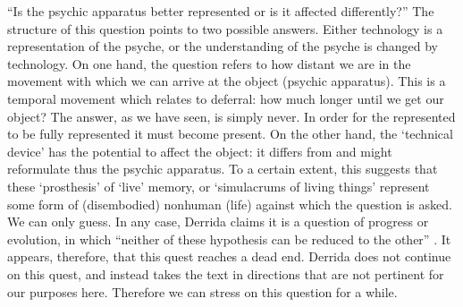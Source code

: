 ``Is the psychic apparatus better represented or is it affected differently?'' The structure of this question points to two possible answers. Either technology is a representation of the psyche, or the understanding of the psyche is changed by technology. On one hand, the question refers to how distant we are in the movement with which we can arrive at the object (psychic apparatus). This is a temporal movement which relates to deferral: how much longer until we get our object? The answer, as we have seen, is simply never. In order for the represented to be fully represented it must become present. On the other hand, the `technical device' has the potential to affect the object: it differs from and might reformulate thus the psychic apparatus. To a certain extent, this suggests that these `prosthesis' of `live' memory, or `simulacrums of living things' represent some form of (disembodied) nonhuman (life) against which the question is asked. We can only guess. In any case, Derrida claims it is a question of progress or evolution, in which ``neither of these hypothesis can be reduced to the other'' \parencite[16]{Der95:Arc}. It appears, therefore, that this quest reaches a dead end. Derrida does not continue on this quest, and instead takes the text in directions that are not pertinent for our purposes here. Therefore we can stress on this question for a while. 


